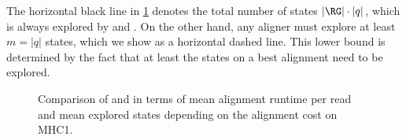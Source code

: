 The horizontal black line in \cref{TRIEfig:scaling_with_errors} denotes the total
number of states $\lvert \RG \rvert \cdot \lvert q \rvert$, which is always
explored by \bitparallel and \pasgal. On the other hand, any aligner must
explore at least $m = \lvert q \rvert$ states, which we show as a horizontal
dashed line. This lower bound is determined by the fact that at least the states
on a best alignment need to be explored.

\begin{figure}[t]
  \caption[Performance scaling with alignment cost]{Comparison of \A and \dijkstra in terms of mean alignment runtime per read and mean explored states depending on the alignment cost on MHC1.}
  \label{TRIEfig:scaling_with_errors}
\end{figure}